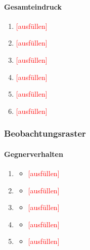 \documentclass[../Main.tex]{subfiles}
\begin{document}
\paragraph{Gesamteindruck}
\begin{enumerate}[label=\textbf{Q\arabic*}, leftmargin=1.5cm, itemsep=0.5em, resume]
    \item \textcolor{red}{[ausfüllen]}
    \item \textcolor{red}{[ausfüllen]}
    \item \textcolor{red}{[ausfüllen]}
    \item \textcolor{red}{[ausfüllen]}
    \item \textcolor{red}{[ausfüllen]}
    \item \textcolor{red}{[ausfüllen]}
\end{enumerate}

\subsubsection{Beobachtungsraster}

\paragraph{Gegnerverhalten}
\begin{enumerate}[label=\textbf{B\arabic*}, leftmargin=1.5cm, itemsep=0.8em]
    \item
        \begin{itemize}[nosep]
            \item \textcolor{red}{[ausfüllen]}
        \end{itemize}
    \item
        \begin{itemize}[nosep]
            \item \textcolor{red}{[ausfüllen]}
        \end{itemize}
    \item
        \begin{itemize}[nosep]
            \item \textcolor{red}{[ausfüllen]}
        \end{itemize}
    \item
        \begin{itemize}[nosep]
            \item \textcolor{red}{[ausfüllen]}
        \end{itemize}
    \item
        \begin{itemize}[nosep]
            \item \textcolor{red}{[ausfüllen]}
        \end{itemize}
\end{enumerate}
\end{document}

